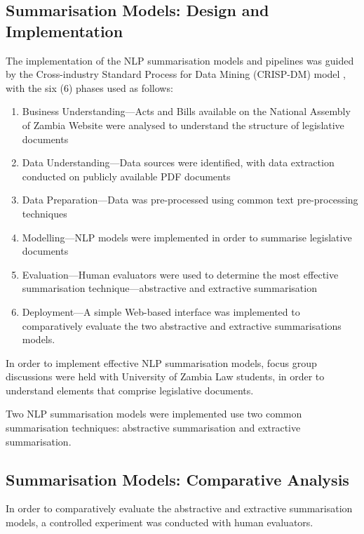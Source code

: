 \documentclass[conference]{IEEEtran}
\begin{document}
\subsection{Summarisation Models: Design and Implementation}
\label{sec:methodology:summarisation_models_implementaiton}
The implementation of the NLP summarisation models and pipelines was guided by the Cross-industry Standard Process for Data Mining (CRISP-DM) model \cite{Wirth2000CRISPDM}, with the six (6) phases used as follows:
\begin{enumerate}[label=\textbf{Phase \arabic*.}, leftmargin=*]
    \item Business Understanding---Acts and Bills available on the National Assembly of Zambia Website were analysed to understand the structure of legislative documents
    \item Data Understanding---Data sources were identified, with data extraction conducted on publicly available PDF documents
    \item Data Preparation---Data was pre-processed using common text pre-processing techniques
    \item Modelling---NLP models were implemented in order to summarise legislative documents
    \item Evaluation---Human evaluators were used to determine the most effective summarisation technique---abstractive and extractive summarisation
    \item Deployment---A simple Web-based interface was implemented to comparatively evaluate the two abstractive and extractive summarisations models.
\end{enumerate}

In order to implement effective NLP summarisation models, focus group discussions were held with University of Zambia Law students, in order to understand elements that comprise legislative documents.

Two NLP summarisation models were implemented use two common summarisation techniques: abstractive summarisation and extractive summarisation.

\subsection{Summarisation Models: Comparative Analysis}
\label{sec:methodology:summarisation_models_analysis}
In order to comparatively evaluate the abstractive and extractive summarisation models, a controlled experiment was conducted with human evaluators.
\end{document}

